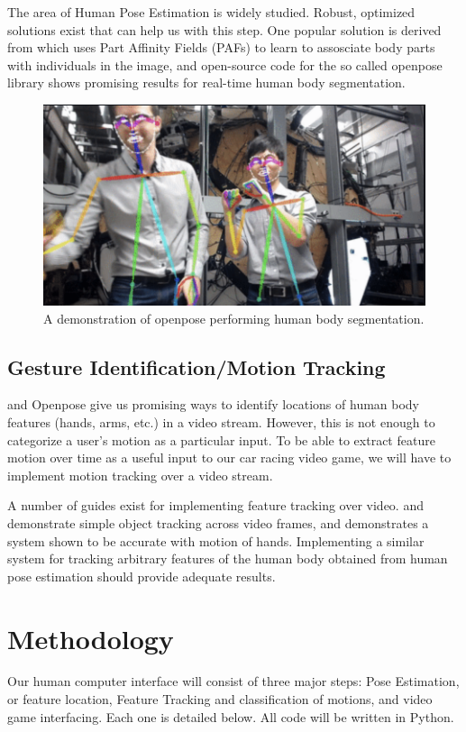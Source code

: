\documentclass[10pt,twocolumn,letterpaper]{article}
\begin{document}
The area of Human Pose Estimation is widely studied. Robust, optimized solutions exist 
that can help us with this step. One popular solution is derived from \cite{8765346} which uses Part Affinity Fields (PAFs) to learn to assosciate body parts with individuals in the image, and 
open-source code for the so called openpose library shows promising results for real-time 
human body segmentation. 

\begin{figure}[h]
    \centering
    \includegraphics[width = .8\linewidth]{openpose.png}
    \caption{A demonstration of openpose performing human body segmentation.}
\end{figure}

\subsection{Gesture Identification/Motion Tracking}
\cite{8765346} and Openpose give us promising ways to identify locations of human body features 
(hands, arms, etc.) in a video stream. However, this is not enough to categorize a user's motion 
as a particular input. To be able to extract feature motion over time as a useful input to our 
car racing video game, we will have to implement motion tracking over a video stream. 

A number of guides exist for implementing feature tracking over video. \cite{tracking_1} 
and \cite{tracking_2} demonstrate simple object tracking across video frames, and \cite{tracking_2} 
demonstrates a system shown to be accurate with motion of hands. Implementing a similar system for 
tracking arbitrary features of the human body obtained from human pose estimation should provide 
adequate results.

\section{Methodology}
Our human computer interface will consist of three major steps: Pose Estimation, or feature 
location, Feature Tracking and classification of motions, and video game interfacing. Each one 
is detailed below. All code will be written in Python.
\end{document}
